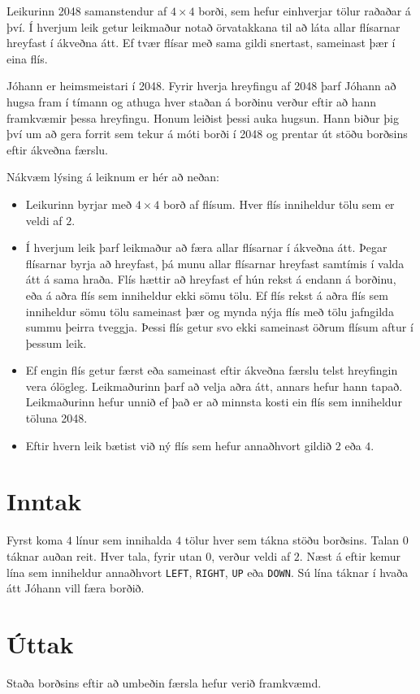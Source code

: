 

Leikurinn 2048 samanstendur af $4\times4$ borði, sem hefur einhverjar tölur raðaðar á því. Í hverjum leik getur leikmaður notað örvatakkana til að láta allar flísarnar hreyfast í ákveðna átt. Ef tvær flísar með sama gildi snertast, sameinast þær í eina flís.

Jóhann er heimsmeistari í 2048. Fyrir hverja hreyfingu af 2048 þarf Jóhann að hugsa fram í tímann og athuga hver staðan á borðinu verður eftir að hann framkvæmir þessa hreyfingu. Honum leiðist þessi auka hugsun. Hann biður þig því um að gera forrit sem tekur á móti borði í 2048 og prentar út stöðu borðsins eftir ákveðna færslu.

Nákvæm lýsing á leiknum er hér að neðan:
\begin{itemize}
    \item Leikurinn byrjar með $4\times4$ borð af flísum. Hver flís inniheldur tölu sem er veldi af $2$.
    \item Í hverjum leik þarf leikmaður að færa allar flísarnar í ákveðna átt. Þegar flísarnar byrja að hreyfast, þá munu allar flísarnar hreyfast samtímis í valda átt á sama hraða. Flís hættir að hreyfast ef hún rekst á endann á borðinu, eða á aðra flís sem inniheldur ekki sömu tölu. Ef flís rekst á aðra flís sem inniheldur sömu tölu sameinast þær og mynda nýja flís með tölu jafngilda summu þeirra tveggja. Þessi flís getur svo ekki sameinast öðrum flísum aftur í þessum leik.
    \item Ef engin flís getur færst eða sameinast eftir ákveðna færslu telst hreyfingin vera ólögleg. Leikmaðurinn þarf að velja aðra átt, annars hefur hann tapað. Leikmaðurinn hefur unnið ef það er að minnsta kosti ein flís sem inniheldur töluna 2048.
    \item Eftir hvern leik bætist við ný flís sem hefur annaðhvort gildið $2$ eða $4$.
\end{itemize}

\section*{Inntak}
Fyrst koma $4$ línur sem innihalda $4$ tölur hver sem tákna stöðu borðsins.
Talan $0$ táknar auðan reit. Hver tala, fyrir utan $0$, verður veldi af $2$.
Næst á eftir kemur lína sem inniheldur annaðhvort \texttt{LEFT},
\texttt{RIGHT}, \texttt{UP} eða \texttt{DOWN}. Sú lína táknar í hvaða átt
Jóhann vill færa borðið.

\section*{Úttak}
Staða borðsins eftir að umbeðin færsla hefur verið framkvæmd.

